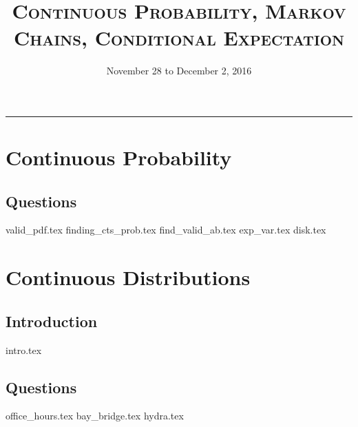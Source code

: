 \documentclass{exam}
\title{\textsc{Continuous Probability, Markov Chains, Conditional Expectation}}
\date{November 28 to December 2, 2016}
\begin{document}
\maketitle
\rule{\textwidth}{0.15em}
\fontsize{12}{15}\selectfont
\thispagestyle{empty}


\section{Continuous Probability}
\subsection{Questions}
\begin{questions}
{valid_pdf.tex}
{finding_cts_prob.tex}
{find_valid_ab.tex}
{exp_var.tex}
{disk.tex}
\end{questions}

\section{Continuous Distributions}
\subsection{Introduction}
{intro.tex}
\subsection{Questions}
\begin{questions}
{office_hours.tex}
{bay_bridge.tex}
{hydra.tex}
\end{questions}
\end{document}
